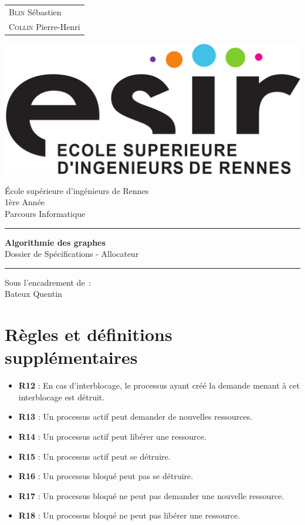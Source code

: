 \documentclass{article}
\newcommand{\bitem}{\item[\textbullet]}
\begin{document}
\begin{titlepage}
	\vspace{-20px}
	\begin{tabular}{l}
		\textsc{Blin} S\'ebastien\\
		\textsc{Collin} Pierre-Henri
	\end{tabular}
	\hfill \vspace{10px}\includegraphics[scale=0.1]{esir.png}\\
	\vfill
	\begin{center}
		\Huge{\'Ecole sup\'erieure d'ing\'enieurs de Rennes}\\
		\vspace{1cm}
		\LARGE{1\`ere Ann\'ee}\\
		\large{Parcours Informatique}\\
		\vspace{0.5cm}\hrule\vspace{0.5cm}
		\LARGE{\textbf{Algorithmie des graphes}}\\
		\Large{Dossier de Spécifications - Allocateur}
		\vspace{0.5cm}\hrule
		\vfill
		\vfill
	\end{center}
	\begin{flushleft}
		\Large{Sous l'encadrement de~:}\\
		\vspace{0.2cm}
		\large{{Bateux} Quentin}
	\end{flushleft}
	\vfill
\end{titlepage}

\section{Règles et définitions supplémentaires}
\begin{itemize}
  \bitem \textbf{R12} : En cas d'interblocage, le processus ayant créé la demande menant à cet interblocage est détruit.
  \bitem \textbf{R13} : Un processus actif peut demander de nouvelles ressources.
  \bitem \textbf{R14} : Un processus actif peut libérer une ressource.
  \bitem \textbf{R15} : Un processus actif peut se détruire.
  \bitem \textbf{R16} : Un processus bloqué peut pas se détruire.
  \bitem \textbf{R17} : Un processus bloqué ne peut pas demander une nouvelle ressource.
  \bitem \textbf{R18} : Un processus bloqué ne peut pas libérer une ressource.
\end{itemize}
\end{document}
